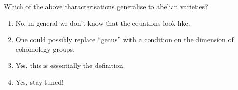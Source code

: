 \documentclass[10pt,]{book}
\numberwithin{equation}{section}
\begin{document}
\hypertarget{p-18}{}%
Which of the above characterisations generalise to abelian varieties?\leavevmode%
\begin{enumerate}
\item\hypertarget{li-11}{}No, in general we don't know that the equations look like.%
\item\hypertarget{li-12}{}One could possibly replace ``genus'' with a condition on the dimension of cohomology groups.%
\item\hypertarget{li-13}{}Yes, this is essentially the definition.%
\item\hypertarget{li-14}{}Yes, stay tuned!%
\end{enumerate}
%
%
%
\typeout{************************************************}
\typeout{************************************************}
%
\end{document}
